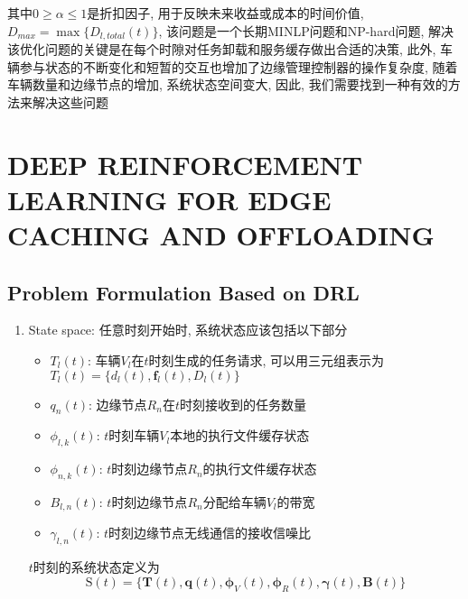 \documentclass[lettersize,journal]{IEEEtran}
\begin{document}
{{其中$ 0 \ge \alpha \le 1 $是折扣因子, 用于反映未来收益或成本的时间价值, $ D_{max} = \max\{D_{l,total}(t)\} $, 该问题是一个长期MINLP问题和NP-hard问题, 解决该优化问题的关键是在每个时隙对任务卸载和服务缓存做出合适的决策, 此外, 车辆参与状态的不断变化和短暂的交互也增加了边缘管理控制器的操作复杂度, 随着车辆数量和边缘节点的增加, 系统状态空间变大, 因此, 我们需要找到一种有效的方法来解决这些问题


%


\section{DEEP REINFORCEMENT LEARNING FOR EDGE CACHING AND OFFLOADING}
\subsection{Problem Formulation Based on DRL}
\begin{enumerate}
	\item State space: 任意时刻开始时, 系统状态应该包括以下部分
	\begin{itemize}
		\item $ T_l(t) $: 车辆$ V_l $在$ t $时刻生成的任务请求, 可以用三元组表示为$ T_{l}(t)=\{ d_{l}(t), \boldsymbol{f}_l(t),D_{l}(t)  \} $
		\item $ q_n(t) $: 边缘节点$ R_n $在$ t $时刻接收到的任务数量
		\item $ \phi_{l,k}(t) $: $ t $时刻车辆$ V_l $本地的执行文件缓存状态
		\item $ \phi_{n,k}(t) $: $ t $时刻边缘节点$ R_n $的执行文件缓存状态
		\item $ B_{l,n}(t) $: $ t $时刻边缘节点$ R_n $分配给车辆$ V_l $的带宽
		\item $ \gamma_{l,n}(t) $: $ t $时刻边缘节点无线通信的接收信噪比
	\end{itemize}
$ t $时刻的系统状态定义为
	\begin{equation}
		\boldsymbol{\mathrm{S}}(t) = \{ \boldsymbol{T}(t),\boldsymbol{q}(t),\boldsymbol{\phi}_V(t),\boldsymbol{\phi}_R(t),\boldsymbol{\gamma}(t), \boldsymbol{B}(t) \}
		\label{system state}
	\end{equation}
	

\end{enumerate}}}
\end{document}

